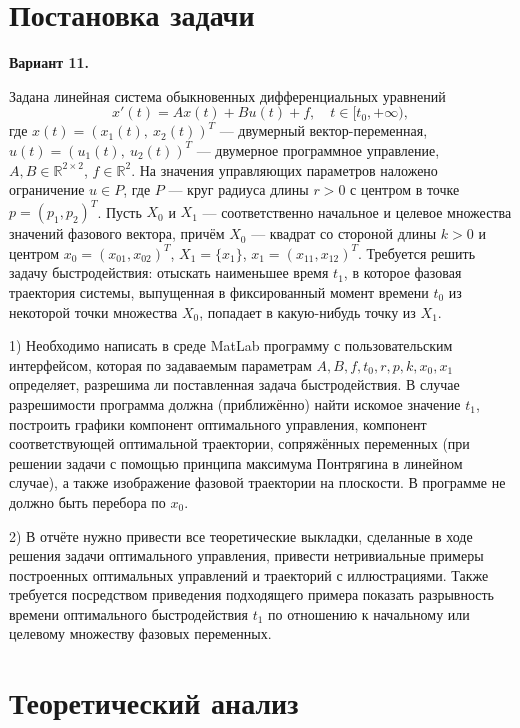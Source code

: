 \documentclass[12pt,titlepage]{article}
\begin{document}
\section{ Постановка задачи }

{\bf{Вариант 11.}}

Задана линейная система обыкновенных дифференциальных уравнений
$$
x'(t) = Ax(t) + Bu(t) + f, \quad t \in [t_{0}, +\infty),
$$
где $ x(t) = (x_{1}(t), \:x_{2}(t))^{T} $ --- двумерный вектор-переменная, $ u(t) = (u_{1}(t), \:u_{2}(t))^{T} $ --- двумерное программное управление, $ A,B \in \mathbb{R}^{2 \times 2} $, $ f \in \mathbb{R}^{2} $. На значения управляющих параметров наложено
ограничение $ u \in P $, где $ P $ --- круг радиуса длины $ r > 0 $ с центром в точке $ p = (p_{1}, p_{2})^{T} $. Пусть $ X_{0} $
и $ X_{1} $ --- соответственно начальное и целевое множества значений фазового вектора, причём $ X_{0} $ --- квадрат со стороной
длины $ k > 0 $ и центром $ x_{0} = (x_{01}, x_{02})^{T} $, $ X_{1} = \{ x_{1} \} $, $ x_{1} = (x_{11}, x_{12})^{T} $. Требуется
решить задачу быстродействия: отыскать наименьшее время $ t_{1} $, в которое фазовая траектория системы, выпущенная в фиксированный момент времени $ t_{0} $ из некоторой точки множества $ X_{0} $, попадает в какую-нибудь точку из $ X_{1} $.

1) Необходимо написать в среде MatLab программу с пользовательским интерфейсом, которая по задаваемым параметрам $ A, B, f, t_{0},
r, p, k, x_{0}, x_{1} $ определяет, разрешима ли поставленная задача быстродействия. В случае разрешимости программа должна (приближённо) найти искомое значение $ t_{1} $, построить графики компонент оптимального управления, компонент соответствующей оптимальной траектории,
сопряжённых переменных (при решении задачи с помощью принципа максимума Понтрягина в линейном случае), а также изображение фазовой траектории на плоскости. В программе не должно быть перебора по $ x_{0} $.

2) В отчёте нужно привести все теоретические выкладки, сделанные в ходе решения задачи оптимального управления, привести нетривиальные примеры построенных оптимальных управлений и траекторий с иллюстрациями. Также требуется посредством приведения подходящего примера
показать разрывность времени оптимального быстродействия $ t_{1} $ по отношению к начальному или целевому множеству фазовых переменных.


\newpage
\section{ Теоретический анализ }
\end{document}
